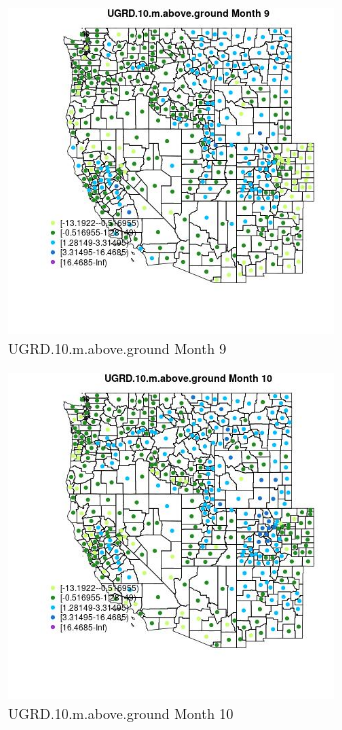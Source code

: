 \begin{figure} 
\centering  
\includegraphics[width=0.77\textwidth]{Code_Outputs/df_report_ML_predictors_CountyCentroid_Locations_Dates_2008-01-01to2018-12-31_MapObsMo9UGRD10maboveground.jpg} 
\caption{\label{fig:df_report_ML_predictors_CountyCentroid_Locations_Dates_2008-01-01to2018-12-31MapObsMo9UGRD10maboveground}UGRD.10.m.above.ground Month 9} 
\end{figure} 
 

\begin{figure} 
\centering  
\includegraphics[width=0.77\textwidth]{Code_Outputs/df_report_ML_predictors_CountyCentroid_Locations_Dates_2008-01-01to2018-12-31_MapObsMo10UGRD10maboveground.jpg} 
\caption{\label{fig:df_report_ML_predictors_CountyCentroid_Locations_Dates_2008-01-01to2018-12-31MapObsMo10UGRD10maboveground}UGRD.10.m.above.ground Month 10} 
\end{figure} 
 

